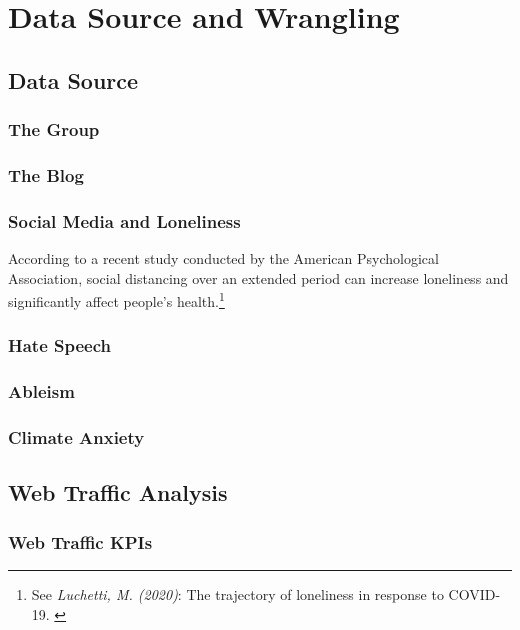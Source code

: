 %
%

\pagebreak
\section{Data Source and Wrangling}

\onehalfspacing

\subsection{Data Source}

\subsubsection{The Group}

\subsubsection{The Blog}

\subsubsection{Social Media and Loneliness}

According to a recent study conducted by the American Psychological Association, social distancing over an extended period can increase loneliness and significantly affect people's health.\footnote{See \textit{Luchetti, M. (2020)}: The trajectory of loneliness in response to COVID-19. \cite{apaLoneliness}}

\subsubsection{Hate Speech}

\subsubsection{Ableism}

\subsubsection{Climate Anxiety}

\subsection{Web Traffic Analysis}

\subsubsection{Web Traffic KPIs}

